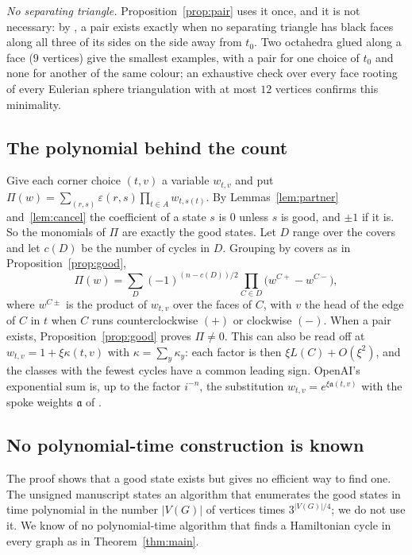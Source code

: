 \documentclass[10pt]{amsart}
\numberwithin{equation}{section}
\theoremstyle{definition}
\theoremstyle{remark}
\newcommand{\eps}{\varepsilon}
\begin{document}
\emph{No separating triangle.} Proposition~\ref{prop:pair} uses it once, and it is not necessary: by \cite[Theorem~1.2]{Anonymous2026}, a pair exists exactly when no separating triangle has black faces along all three of its sides on the side away from $t_0$. Two octahedra glued along a face ($9$ vertices) give the smallest examples, with a pair for one choice of $t_0$ and none for another of the same colour; an exhaustive check over every face rooting of every Eulerian sphere triangulation with at most $12$ vertices confirms this minimality.

\subsection*{The polynomial behind the count}
Give each corner choice $(t,v)$ a variable $w_{t,v}$ and put $\Pi(w)=\sum_{(r,s)}\eps(r,s)\prod_{t\in A}w_{t,s(t)}$.
By Lemmas~\ref{lem:partner} and~\ref{lem:cancel} the coefficient of a state $s$ is $0$ unless $s$ is good, and $\pm1$ if it is. So the monomials of $\Pi$ are exactly the good states.
Let $D$ range over the covers and let $c(D)$ be the number of cycles in $D$. Grouping by covers as in Proposition~\ref{prop:good},
\[
\Pi(w)=\sum_{D}(-1)^{(n-c(D))/2}\prod_{C\in D}\bigl(w^{C+}-w^{C-}\bigr),
\]
where $w^{C\pm}$ is the product of $w_{t,v}$ over the faces of $C$, with $v$ the head of the edge of $C$ in $t$ when $C$ runs counterclockwise $(+)$ or clockwise $(-)$.
When a pair exists, Proposition~\ref{prop:good} proves $\Pi\neq0$.
This can also be read off at $w_{t,v}=1+\xi\kappa(t,v)$ with $\kappa=\sum_y\kappa_y$: each factor is then $\xi L(C)+O(\xi^2)$, and the classes with the fewest cycles have a common leading sign.
OpenAI's exponential sum is, up to the factor $i^{-n}$, the substitution $w_{t,v}=e^{\xi \mathfrak a(t,v)}$ with the spoke weights $\mathfrak a$ of \cite[Lemma~5.3]{OpenAI2026}.

\subsection*{No polynomial-time construction is known}
The proof shows that a good state exists but gives no efficient way to find one.
The unsigned manuscript \cite{Anonymous2026} states an algorithm that enumerates the good states in time polynomial in the number $|V(G)|$ of vertices times $3^{|V(G)|/4}$; we do not use it.
We know of no polynomial-time algorithm that finds a Hamiltonian cycle in every graph as in Theorem~\ref{thm:main}.
\end{document}
